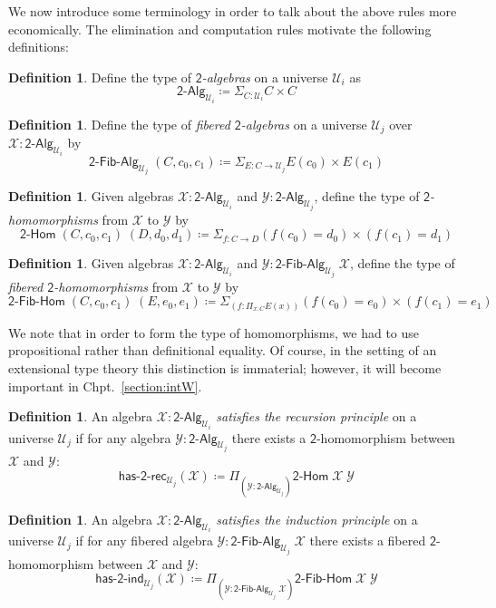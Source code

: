 \documentclass[11pt]{article}
\newcommand{\X}{\mathcal{X}}
\newcommand{\Y}{\mathcal{Y}}
\newcommand{\prd}[1]{\Pi_{#1}}
\newcommand{\sm}[1]{\Sigma_{#1}}
\newcommand{\defeq}{\coloneqq}
\newcommand{\Bool}{\mathsf{2}}
\newcommand{\UU}{\mathcal{U}}
\newcommand{\BoolAlg}{\mathsf{2}\text{-}\mathsf{Alg}}
\newcommand{\BoolHom}{\mathsf{2}\text{-}\mathsf{Hom}}
\newcommand{\HasBoolRec}{\mathsf{has}\text{-}\mathsf{2}\text{-}\mathsf{rec}}
\newcommand{\HasBoolInd}{\mathsf{has}\text{-}\mathsf{2}\text{-}\mathsf{ind}}
\newcommand{\BoolFibAlg}{\mathsf{2}\text{-}\mathsf{Fib}\text{-}\mathsf{Alg}}
\newcommand{\BoolFibHom}{\mathsf{2}\text{-}\mathsf{Fib}\text{-}\mathsf{Hom}}
\theoremstyle{definition}
\newtheorem{definition}[theorem]{Definition}
\begin{document}
We now introduce some terminology in order to talk about the above rules more economically. The elimination and computation rules motivate the following definitions:

\begin{definition}\label{def:BoolAlg}
Define the type of \emph{$\Bool$-algebras} on a universe $\UU_i$ as 
\[\BoolAlg_{\UU_i} \defeq \sm{C : \UU_i} C \times C \]
\end{definition}

\begin{definition}\label{def:BoolFibAlg}
Define the type of \emph{fibered $\Bool$-algebras} on a universe $\UU_j$ over $\mathcal{X} : \BoolAlg_{\UU_i}$ by
\[\BoolFibAlg_{\UU_j} \; (C,c_0,c_1) \defeq \sm{E : C \to \UU_j} E(c_0) \times E(c_1) \]
\end{definition}

\begin{definition}\label{def:BoolHom}
Given algebras $\X : \BoolAlg_{\UU_i}$ and $\Y : \BoolAlg_{\UU_j}$, define the type of \emph{$\Bool$-homomorphisms} from $\X$ to $\Y$ by \[\BoolHom \; (C,c_0,c_1) \; (D,d_0,d_1) \defeq \sm{f:C \to D} (f(c_0) = d_0) \times (f(c_1) = d_1) \]
\end{definition}

\begin{definition}\label{def:BoolFibHom}
Given algebras $\X : \BoolAlg_{\UU_i}$ and $\Y : \BoolFibAlg_{\UU_j} \; \X$, define the type of \emph{fibered $\Bool$-homomorphisms} from $\X$ to $\Y$ by
\[\BoolFibHom \; (C,c_0,c_1) \; (E,e_0,e_1) \defeq \sm{(f:\prd{x:C} E(x))} (f(c_0) = e_0) \times (f(c_1) = e_1) \]
\end{definition}

We note that in order to form the type of homomorphisms, we had to use propositional rather than definitional equality. Of course, in the setting of an extensional type theory this distinction is immaterial; however, it will become important in Chpt.~\ref{section:intW}.

\begin{definition}\label{def:BoolRec}
An algebra $\X : \BoolAlg_{\UU_i}$ \emph{satisfies the recursion principle} on a universe $\UU_j$ if for any 
algebra $\Y : \BoolAlg_{\UU_j}$ there exists a $\Bool$-homomorphism between $\X$ and $\Y$:
\[\HasBoolRec_{\UU_j}(\X) \defeq \prd{(\Y:\BoolAlg_{\UU_j})} \BoolHom \; \X \; \Y\] 
\end{definition}

\begin{definition}\label{def:BoolInd}
An algebra $\mathcal{X} : \BoolAlg_{\UU_i}$ \emph{satisfies the induction principle} on a universe $\UU_j$ if for any 
fibered algebra $\Y : \BoolFibAlg_{\UU_j} \; \X$ there exists a fibered $\Bool$-homomorphism between $\X$ and $\Y$:
\[\HasBoolInd_{\UU_j}(\X) \defeq \prd{(\Y:\BoolFibAlg_{\UU_j} \; \X)} \BoolFibHom \; \X \; \Y\] 
\end{definition}
\end{document}
